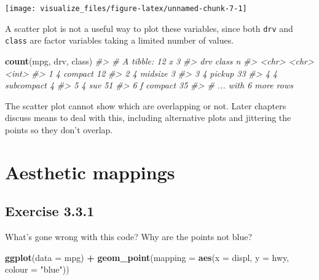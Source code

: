 \documentclass[]{book}
\newenvironment{Shaded}{\begin{snugshade}}{\end{snugshade}}
\newcommand{\CommentTok}[1]{\textcolor[rgb]{0.56,0.35,0.01}{\textit{#1}}}
\newcommand{\DataTypeTok}[1]{\textcolor[rgb]{0.13,0.29,0.53}{#1}}
\newcommand{\KeywordTok}[1]{\textcolor[rgb]{0.13,0.29,0.53}{\textbf{#1}}}
\newcommand{\NormalTok}[1]{#1}
\newcommand{\OperatorTok}[1]{\textcolor[rgb]{0.81,0.36,0.00}{\textbf{#1}}}
\newcommand{\StringTok}[1]{\textcolor[rgb]{0.31,0.60,0.02}{#1}}
\theoremstyle{plain}
\theoremstyle{remark}
\theoremstyle{definition}
\theoremstyle{definition}
\theoremstyle{definition}
\theoremstyle{remark}
\begin{document}
\begin{center}\texttt{[image: visualize\_files/figure-latex/unnamed-chunk-7-1]} \end{center}

A scatter plot is not a useful way to plot these variables, since both
\texttt{drv} and \texttt{class} are factor variables taking a limited
number of values.

\begin{Shaded}
\begin{Highlighting}[]
\KeywordTok{count}\NormalTok{(mpg, drv, class)}
\CommentTok{#> # A tibble: 12 x 3}
\CommentTok{#>   drv   class          n}
\CommentTok{#>   <chr> <chr>      <int>}
\CommentTok{#> 1 4     compact       12}
\CommentTok{#> 2 4     midsize        3}
\CommentTok{#> 3 4     pickup        33}
\CommentTok{#> 4 4     subcompact     4}
\CommentTok{#> 5 4     suv           51}
\CommentTok{#> 6 f     compact       35}
\CommentTok{#> # ... with 6 more rows}
\end{Highlighting}
\end{Shaded}

The scatter plot cannot show which are overlapping or not. Later
chapters discuss means to deal with this, including alternative plots
and jittering the points so they don't overlap.

\hypertarget{aesthetic-mappings}{%
\section{Aesthetic mappings}\label{aesthetic-mappings}}

\hypertarget{exercise-3.3.1}{%
\subsection*{\texorpdfstring{Exercise
{3.3.1}}{Exercise 3.3.1}}\label{exercise-3.3.1}}

What's gone wrong with this code? Why are the points not blue?

\begin{Shaded}
\begin{Highlighting}[]
\KeywordTok{ggplot}\NormalTok{(}\DataTypeTok{data =}\NormalTok{ mpg) }\OperatorTok{+}
\StringTok{  }\KeywordTok{geom_point}\NormalTok{(}\DataTypeTok{mapping =} \KeywordTok{aes}\NormalTok{(}\DataTypeTok{x =}\NormalTok{ displ, }\DataTypeTok{y =}\NormalTok{ hwy, }\DataTypeTok{colour =} \StringTok{"blue"}\NormalTok{))}
\end{Highlighting}
\end{Shaded}
\end{document}
